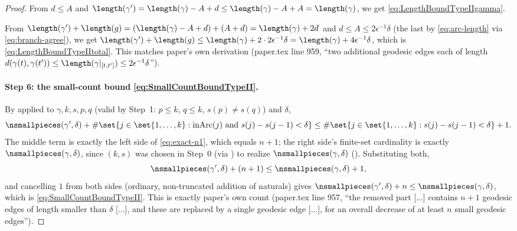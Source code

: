 \begin{proof}
  From $d \le A$ and $\length(\gamma') = \length(\gamma)-A+d \le \length(\gamma)-A+A =
  \length(\gamma)$, we get \eqref{eq:LengthBoundTypeIIgamma}.

  From $\length(\gamma')+\length(g) = (\length(\gamma)-A+d)+(A+d) = \length(\gamma)+2d$ and $d \le A
  \le 2\epsilon^{-1}\delta$ (the last by \eqref{eq:arc-length} via \eqref{eq:branch-agree}), we get
  $\length(\gamma')+\length(g) \le \length(\gamma)+2\cdot 2\epsilon^{-1}\delta = \length(\gamma)+
  4\epsilon^{-1}\delta$, which is \eqref{eq:LengthBoundTypeIItotal}. This matches paper's own
  derivation (paper.tex line 959, ``two additional geodesic edges each of length
  $d(\gamma(t),\gamma(t'))\le\length(\gamma|_{[t,t']})\le2\epsilon^{-1}\delta$'').

  \paragraph{Step 6: the small-count bound \eqref{eq:SmallCountBoundTypeII}.} By
   applied to $\gamma,k,s,p,q$ (valid by Step~1: $p\le k$,
  $q\le k$, $s(p)\ne s(q)$) and $\delta$,
  \[
    \nsmallpieces(\gamma',\delta) + \#\set{j\in\set{1,\dots,k} : \mathrm{inArc}(j) \text{ and }
    s(j)-s(j-1)<\delta} \le \#\set{j\in\set{1,\dots,k}:s(j)-s(j-1)<\delta} + 1
    .
  \]
  The middle term is exactly the left side of \eqref{eq:exact-n1}, which equals $n+1$; the right
  side's finite-set cardinality is exactly $\nsmallpieces(\gamma,\delta)$, since $(k,s)$ was chosen
  in Step~0 (via ) to realize
  $\nsmallpieces(\gamma,\delta)$ (). Substituting both,
  \[
    \nsmallpieces(\gamma',\delta) + (n+1) \le \nsmallpieces(\gamma,\delta) + 1
    ,
  \]
  and cancelling $1$ from both sides (ordinary, non-truncated addition of naturals) gives
  $\nsmallpieces(\gamma',\delta)+n \le \nsmallpieces(\gamma,\delta)$, which is
  \eqref{eq:SmallCountBoundTypeII}. This is exactly paper's own count (paper.tex line 957, ``the
  removed part [...] contains $n+1$ geodesic edges of length smaller than $\delta$ [...], and these
  are replaced by a single geodesic edge [...], for an overall decrease of at least $n$ small
  geodesic edges'').


\end{proof}
